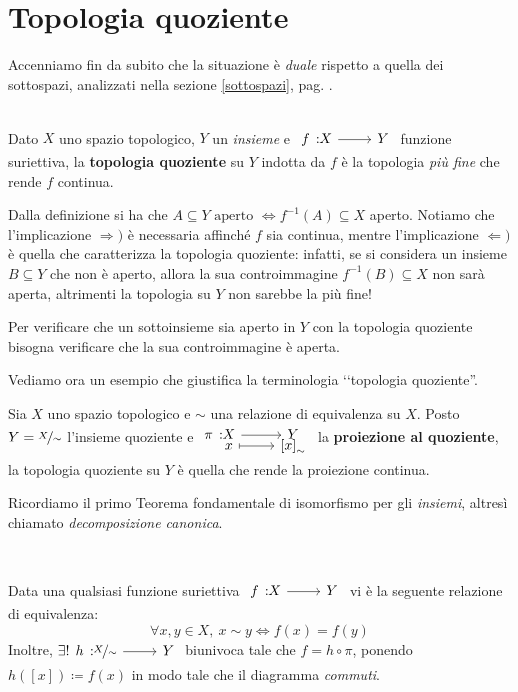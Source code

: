 \section{Topologia quoziente}
Accenniamo fin da subito che la situazione è \textit{duale} rispetto a quella dei sottospazi, analizzati nella sezione \ref{sottospazi}, pag. \pageref{sottospazi}.
\begin{define}~{}\\
	Dato $X$ uno spazio topologico, $Y$ un \textit{insieme} e $\funz f X Y$ funzione suriettiva, la \textbf{topologia quoziente} su $Y$ indotta da $f$ è la topologia \textit{più fine} che rende $f$ continua.
\end{define}
Dalla definizione si ha che $\displaystyle A\subseteq Y \text{ aperto } \iff f^{-1}(A)\subseteq X$ aperto. Notiamo che l'implicazione $\Rightarrow)$ è necessaria affinché $f$ sia continua, mentre l'implicazione $\Leftarrow)$ è quella che caratterizza la topologia quoziente: infatti, se si considera un insieme $B\subseteq Y$ che non è aperto, allora la sua controimmagine $f^{-1}(B)\subseteq X$ non sarà aperta, altrimenti la topologia su $Y$ non sarebbe la più fine!
\begin{tips}
	Per verificare che un sottoinsieme sia aperto in $Y$ con la topologia quoziente bisogna verificare che la sua controimmagine è aperta.
\end{tips}
Vediamo ora un esempio che giustifica la terminologia ‘‘topologia quoziente''.
\begin{example}
	Sia $X$ uno spazio topologico e $\sim$ una relazione di equivalenza su $X$. Posto $Y=\nicefrac{X}{\sim}$ l'insieme quoziente e $\funztot \pi X Y x {\left[x\right]_\sim}$ la \textbf{proiezione al quoziente}, la topologia quoziente su $Y$ è quella che rende la proiezione continua.
\end{example}
Ricordiamo il primo Teorema fondamentale di isomorfismo per gli \textit{insiemi}, altresì chiamato \textit{decomposizione canonica}.
\begin{remember}~{}\\
	\begin{minipage}[t]{0.83\textwidth}
		Data una qualsiasi funzione suriettiva $\funz f X Y$ vi è la seguente relazione di equivalenza: 
		\begin{equation}
			\forall x,y\in X, \ x\sim y \iff f(x)=f(y)
		\end{equation}
		Inoltre, $\exists ! \funz h {\nicefrac{X}{\sim}} Y$ biunivoca tale che $f=h\circ\pi$, ponendo $h\left( [x] \right) \coloneqq f(x)$ in modo tale che il diagramma \textit{commuti}.
	\end{minipage}
	\begin{minipage}[t]{0.13\textwidth}\vspace{-10pt}
	\end{minipage}
\end{remember}
